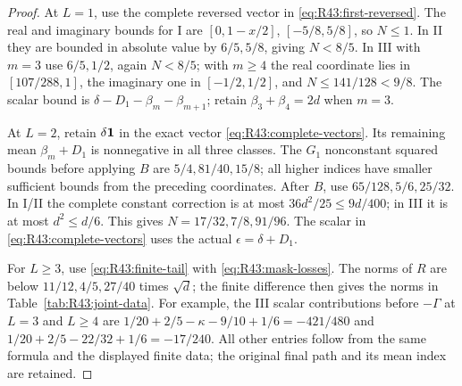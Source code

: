 \begin{proof}
At \(L=1\), use the complete reversed vector in
\eqref{eq:R43:first-reversed}. The real and imaginary bounds for I
are \([0,1-x/2]\), \([-5/8,5/8]\), so \(N\le1\).
In II they are bounded in absolute value by \(6/5,5/8\),
giving \(N<8/5\). In III with \(m=3\) use \(6/5,1/2\),
again \(N<8/5\); with \(m\ge4\) the real coordinate lies in
\([107/288,1]\), the imaginary one in \([-1/2,1/2]\), and
\(N\le141/128<9/8\). The scalar bound is
\(\delta-D_1-\beta_m-\beta_{m+1}\); retain
\(\beta_3+\beta_4=2d\) when \(m=3\).

At \(L=2\), retain \(\delta\mathbf1\) in the exact vector
\eqref{eq:R43:complete-vectors}. Its remaining mean
\(\beta_m+D_1\) is nonnegative in all three classes.
The \(G_1\) nonconstant squared bounds before applying \(B\)
are \(5/4,81/40,15/8\); all higher indices have smaller sufficient
bounds from the preceding coordinates. After \(B\), use
\(65/128,5/6,25/32\). In I/II the complete constant correction
is at most \(36d^2/25\le9d/400\); in III it is at most
\(d^2\le d/6\). This gives \(N=17/32,7/8,91/96\).
The scalar in \eqref{eq:R43:complete-vectors} uses the actual
\(\epsilon=\delta+D_1\).

For \(L\ge3\), use \eqref{eq:R43:finite-tail} with
\eqref{eq:R43:mask-losses}. The norms of \(R\) are below
\(11/12,4/5,27/40\) times \(\sqrt d\); the finite difference
then gives the norms in Table~\ref{tab:R43:joint-data}.
For example, the III scalar contributions before \(-\Gamma\)
at \(L=3\) and \(L\ge4\) are
\(1/20+2/5-\kappa-9/10+1/6=-421/480\) and
\(1/20+2/5-22/32+1/6=-17/240\).
All other entries follow from the same formula and the displayed
finite data; the original final path and its mean index are retained.


\end{proof}
